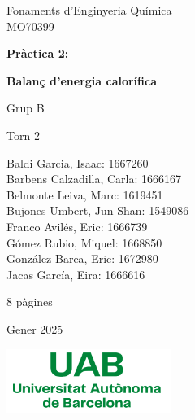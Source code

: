 \documentclass[10pt, twoside]{article}
\begin{document}
\begin{titlepage}
\centering
{\Large Fonaments d'Enginyeria Química \\ MO70399 \par}
\vspace{2cm}
{\Huge \textbf{Pràctica 2:} \par}
\vspace{1cm}
{\Huge \textbf{Balanç d'energia calorífica} \par}
\vspace{2cm}
{\Large Grup B \par}
\vspace{0.5cm}
{\Large Torn 2 \par}
\vspace{0.5cm}
{\normalsize Baldi Garcia, Isaac: 1667260 \\ Barbens Calzadilla, Carla: 1666167 \\ Belmonte Leiva, Marc: 1619451 \\ Bujones Umbert, Jun Shan: 1549086 \\ Franco Avilés, Eric: 1666739 \\ Gómez Rubio, Miquel: 1668850 \\ González Barea, Eric: 1672980 \\ Jacas García, Eira: 1666616\par}
\vspace{2cm}
{\normalsize 8 pàgines \par}
{\Large Gener 2025 \par}
\vspace{2cm}
\includegraphics[width=0.4\textwidth]{Logo_UAB.png}


\end{titlepage}

\renewcommand{\cftsecfont}{}
\renewcommand{\cftsecpagefont}{}
\renewcommand{\cftsecleader}{\cftdotfill{\cftdotsep}}
\renewcommand{\cftdotsep}{0.2}
\setlength{\cftbeforesecskip}{0.5em}
\setlength{\cftbeforesubsecskip}{0.5em}
\tableofcontents

\newpage
{}
\setcounter{page}{1}

\pagestyle{fancy}
\end{document}
